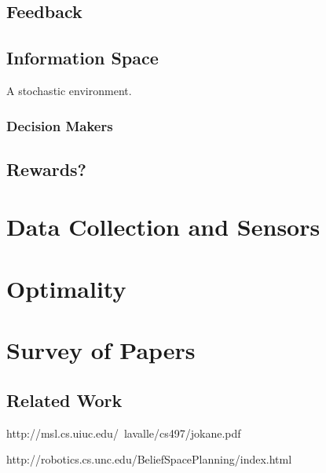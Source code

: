 \subsection{Feedback}

\subsection{Information Space}
A stochastic environment.
\subsubsection{Decision Makers}

\subsection{Rewards?}

\section{Data Collection and Sensors}



\section{Optimality}



\section{Survey of Papers}

\subsection{Related Work}

http://msl.cs.uiuc.edu/~lavalle/cs497/jokane.pdf

http://robotics.cs.unc.edu/BeliefSpacePlanning/index.html
